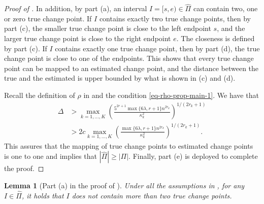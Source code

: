 \documentclass{article}
\newtheorem{lemma}[theorem]{Lemma}
\begin{document}
\begin{proof}[Proof of ]
In addition, by part (a), an interval $I = [s, e) \in \widehat{\Pi}$ can contain two, one or zero true change point.  If $I$ contains exactly two true change points, then by part (c), the smaller true change point is close to the left endpoint $s$, and the larger true change point is close to the right endpoint $e$.  The closeness is defined by part (c).  If $I$ contains exactly one true change point, then by part (d), the true change point is close to one of the endpoints.  This shows that every true change point can be mapped to an estimated change point, and the distance between the true and the estimated is upper bounded by what is shown in (c) and (d). 

Recall the definition of $\rho$ in  and the condition \eqref{eq-rho-prop-main-1}.  We have that
	\begin{align*}
		\Delta & > \max_{k = 1, \ldots, K} \left(\frac{5^{2r+1} \max\{6\lambda, r+1\} n^{2r_k}}{\kappa_k^2}\right)^{1/(2r_k+1)} \\
		& > 2c \max_{k = 1, \ldots, K} \left(\frac{ \max\{6\lambda, r+1\} n^{2r_k}}{\kappa_k^2}\right)^{1/(2r_k+1)}.
	\end{align*}
	This assures that the mapping of true change points to estimated change points is one to one and implies that $|\widehat{\Pi}| \geq |\Pi|$.  Finally, part (e) is deployed to complete the proof. 
\end{proof}

\begin{lemma}[Part (a) in the proof of ]\label{lem-no-more-than-two}
Under all the assumptions in , for any $I \in \widehat{\Pi}$, it holds that $I$ does not contain more than two true change points.
\end{lemma}
\end{document}
